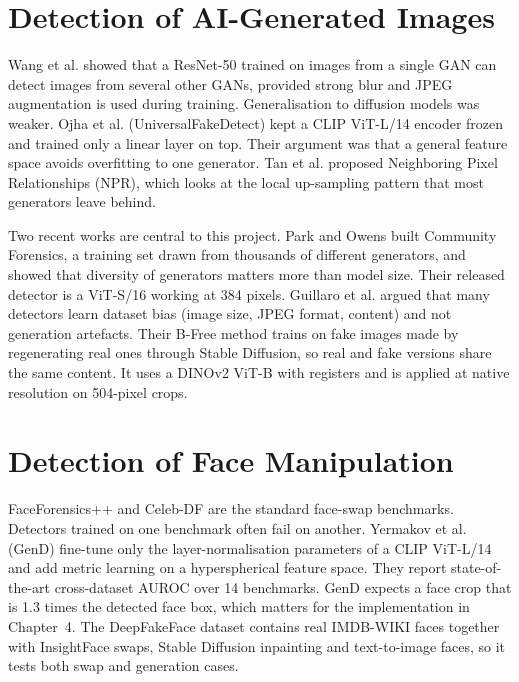 \documentclass[12pt,a4paper,oneside]{report}
\begin{document}
\section{Detection of AI-Generated Images}
Wang et al.\cite{wang2020} showed that a ResNet-50 trained on images from a single GAN can detect images from several other GANs, provided strong blur and JPEG augmentation is used during training. Generalisation to diffusion models was weaker. Ojha et al.\cite{ojha2023} (UniversalFakeDetect) kept a CLIP ViT-L/14 encoder\cite{radford2021} frozen and trained only a linear layer on top. Their argument was that a general feature space avoids overfitting to one generator. Tan et al.\cite{tan2024} proposed Neighboring Pixel Relationships (NPR), which looks at the local up-sampling pattern that most generators leave behind.

Two recent works are central to this project. Park and Owens\cite{park2025} built Community Forensics, a training set drawn from thousands of different generators, and showed that diversity of generators matters more than model size. Their released detector is a ViT-S/16\cite{dosovitskiy2021} working at 384 pixels. Guillaro et al.\cite{guillaro2025} argued that many detectors learn dataset bias (image size, JPEG format, content) and not generation artefacts. Their B-Free method trains on fake images made by regenerating real ones through Stable Diffusion, so real and fake versions share the same content. It uses a DINOv2\cite{oquab2024} ViT-B with registers\cite{darcet2024} and is applied at native resolution on 504-pixel crops.

\section{Detection of Face Manipulation}
FaceForensics++\cite{rossler2019} and Celeb-DF\cite{li2020} are the standard face-swap benchmarks. Detectors trained on one benchmark often fail on another. Yermakov et al.\cite{yermakov2026} (GenD) fine-tune only the layer-normalisation parameters of a CLIP ViT-L/14 and add metric learning on a hyperspherical feature space. They report state-of-the-art cross-dataset AUROC over 14 benchmarks. GenD expects a face crop that is 1.3 times the detected face box, which matters for the implementation in Chapter~4. The DeepFakeFace dataset\cite{song2023} contains real IMDB-WIKI faces together with InsightFace swaps, Stable Diffusion inpainting and text-to-image faces, so it tests both swap and generation cases.
\end{document}
